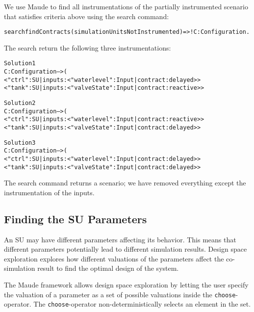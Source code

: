 \begin{example}
We use Maude to find all instrumentations of the partially instrumented scenario that satisfies criteria above using the search command: 

\small
\begin{alltt}
search findContracts(simulationUnitsNotInstrumented) =>! C:Configuration .
\end{alltt}

The search return the following three instrumentations:

\begin{alltt}
Solution 1
C:Configuration --> (
< "ctrl" : SU | inputs : < "waterlevel" : Input | contract : delayed > >
< "tank" : SU | inputs : < "valveState" : Input | contract : reactive > >

Solution 2
C:Configuration --> (
< "ctrl" : SU | inputs : < "waterlevel" : Input | contract : reactive > >
< "tank" : SU | inputs : < "valveState" : Input | contract : delayed > >

Solution 3
C:Configuration --> (
< "ctrl" : SU | inputs : < "waterlevel" : Input | contract : delayed > >
< "tank" : SU | inputs : < "valveState" : Input | contract : delayed > >

\end{alltt}
\normalsize

The search command returns a scenario; we have removed everything except the instrumentation of the inputs.
\end{example}

\subsection{Finding the SU Parameters}
An SU may have different parameters affecting its behavior.
This means that different parameters potentially lead to different simulation results.
Design space exploration explores how different valuations of the parameters affect the co-simulation result to find the optimal design of the system. 

The Maude framework allows design space exploration by letting the user specify the valuation of a parameter as a set of possible valuations inside the \texttt{choose}-operator.
The \texttt{choose}-operator non-deterministically selects an element in the set.


